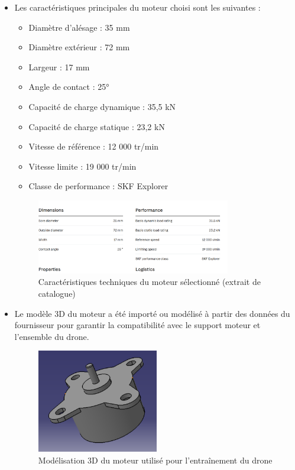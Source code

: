 \documentclass[a4paper,12pt]{report}
\begin{document}
\begin{itemize}
    \item Les caractéristiques principales du moteur choisi sont les suivantes :
    \begin{itemize}
        \item Diamètre d'alésage : 35 mm
        \item Diamètre extérieur : 72 mm
        \item Largeur : 17 mm
        \item Angle de contact : 25°
        \item Capacité de charge dynamique : 35,5 kN
        \item Capacité de charge statique : 23,2 kN
        \item Vitesse de référence : 12 000 tr/min
        \item Vitesse limite : 19 000 tr/min
        \item Classe de performance : SKF Explorer
    \end{itemize}
    \begin{figure}[H]
        \centering
        \includegraphics[width=0.8\textwidth]{images/moteur_caracteristiques.png}
        \caption{Caractéristiques techniques du moteur sélectionné (extrait de catalogue)}
        \label{fig:moteur_caracteristiques}
    \end{figure}
    \item Le modèle 3D du moteur a été importé ou modélisé à partir des données du fournisseur pour garantir la compatibilité avec le support moteur et l'ensemble du drone.
    \begin{figure}[H]
        \centering
        \includegraphics[width=0.5\textwidth]{images/moteur_modele.png}
        \caption{Modélisation 3D du moteur utilisé pour l'entraînement du drone}
        \label{fig:moteur_modele}
    \end{figure}
\end{itemize}
\end{document}

